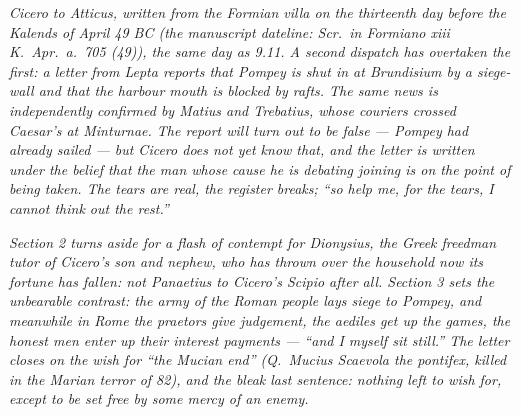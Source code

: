 
\textit{Cicero to Atticus, written from the Formian villa
on the thirteenth day before the Kalends of April 49 BC
(the manuscript dateline: \textit{Scr.\ in Formiano xiii
K.\ Apr.\ a.\ 705 (49)}), the same day as 9.11. A second
dispatch has overtaken the first: a letter from Lepta
reports that Pompey is shut in at Brundisium by a
siege-wall and that the harbour mouth is blocked by
rafts. The same news is independently confirmed by
Matius and Trebatius, whose couriers crossed Caesar's
at Minturnae. The report will turn out to be false ---
Pompey had already sailed --- but Cicero does not yet
know that, and the letter is written under the belief
that the man whose cause he is debating joining is on
the point of being taken. The tears are real, the
register breaks; ``so help me, for the tears, I cannot
think out the rest.''}

\textit{Section 2 turns aside for a flash of contempt
for Dionysius, the Greek freedman tutor of Cicero's
son and nephew, who has thrown over the household now
its fortune has fallen: not Panaetius to Cicero's
Scipio after all. Section 3 sets the unbearable
contrast: the army of the Roman people lays siege to
Pompey, and meanwhile in Rome the praetors give
judgement, the aediles get up the games, the honest
men enter up their interest payments --- ``and I myself
sit still.'' The letter closes on the wish for ``the
Mucian end'' (Q.\ Mucius Scaevola the pontifex, killed
in the Marian terror of 82), and the bleak last
sentence: nothing left to wish for, except to be set
free by some mercy of an enemy.}
